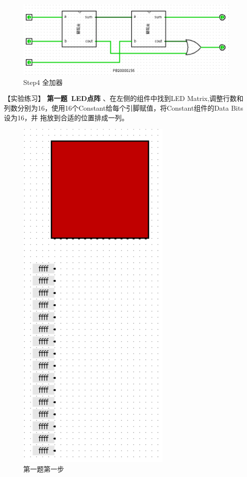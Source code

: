 \documentclass[UTF8]{ctexart}
\begin{document}
\begin{figure}[h!]
    \centering
    \includegraphics[scale=0.6]{S4_3.PNG}
    \caption{Step4 全加器}
\end{figure}
\newline
【实验练习】
\newline
\textbf{第一题\ LED点阵}
、在左侧的组件中找到LED Matrix,调整行数和列数分别为16，使用16个Constant给每个引脚赋值，将Constant组件的Data Bits设为16，并
拖放到合适的位置排成一列。
\begin{figure}[h!]
    \centering
    \includegraphics[scale=0.6]{p1_s1.PNG}
    \caption{第一题第一步}
\end{figure}
\end{document}
